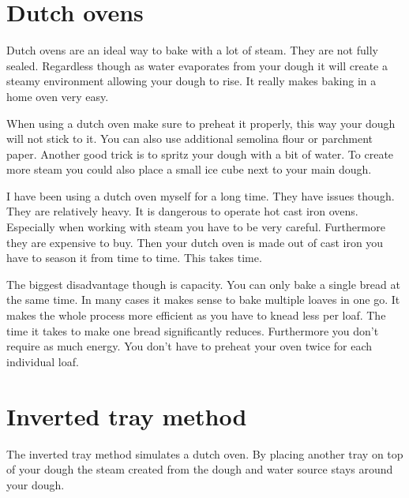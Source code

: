 \section{Dutch ovens}

Dutch ovens are an ideal way to bake with a lot of
steam. They are not fully sealed. Regardless though
as water evaporates from your dough it will create a steamy
environment allowing your dough to rise. It really
makes baking in a home oven very easy.

When using a dutch oven make sure to preheat it properly,
this way your dough will not stick to it. You can also
use additional semolina flour or parchment paper. Another
good trick is to spritz your dough with a bit of water.
To create more steam you could also place a small ice cube
next to your main dough.

I have been using a dutch oven myself for a long time. They
have issues though. They are relatively heavy. It is dangerous
to operate hot cast iron ovens. Especially when working with steam
you have to be very careful.  Furthermore
they are expensive to buy. Then your dutch oven is made out
of cast iron you have to season it from time to time. This takes
time.

The biggest disadvantage though is
capacity. You can only bake a single bread at the
same time. In many cases it makes sense to bake multiple
loaves in one go. It makes the whole process more
efficient as you have to knead less per loaf. The time it
takes to make one bread significantly reduces. Furthermore
you don't require as much energy. You don't have
to preheat your oven twice for each individual loaf.


\section{Inverted tray method}

The inverted tray method simulates a dutch oven.
By placing another tray on top of your dough the steam
created from the dough and water source stays
around your dough.


